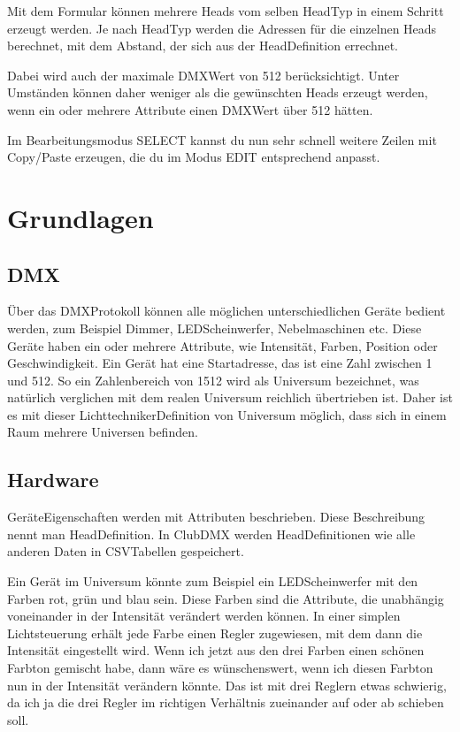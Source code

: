 \documentclass[letterpaper,10pt,ngerman]{sphinxmanual}
\begin{document}
Mit dem Formular können mehrere Heads vom selben Head\sphinxhyphen{}Typ in einem Schritt
erzeugt werden. Je nach Head\sphinxhyphen{}Typ werden die Adressen für die einzelnen Heads
berechnet, mit dem Abstand, der sich aus der Head\sphinxhyphen{}Definition errechnet.

Dabei wird auch der maximale DMX\sphinxhyphen{}Wert von 512 berücksichtigt.
Unter Umständen können daher weniger als die gewünschten Heads erzeugt werden,
wenn ein oder mehrere Attribute einen DMX\sphinxhyphen{}Wert über 512 hätten.

Im Bearbeitungsmodus SELECT kannst du nun sehr schnell weitere
Zeilen mit Copy/Paste erzeugen, die du im Modus EDIT entsprechend anpasst.

\noindent{}


\chapter{Grundlagen}
\label{\detokenize{grundlagen:grundlagen}}\label{\detokenize{grundlagen::doc}}

\section{DMX}
\label{\detokenize{grundlagen:dmx}}
Über das DMX\sphinxhyphen{}Protokoll können alle möglichen unterschiedlichen Geräte bedient
werden, zum Beispiel Dimmer, LED\sphinxhyphen{}Scheinwerfer, Nebelmaschinen etc. Diese Geräte
haben ein oder mehrere Attribute, wie Intensität, Farben,
Position oder Geschwindigkeit.
Ein Gerät hat eine Startadresse, das ist eine Zahl zwischen 1 und 512.
So ein Zahlenbereich von 1\sphinxhyphen{}512 wird als Universum bezeichnet, was natürlich
verglichen mit dem realen Universum reichlich übertrieben ist.
Daher ist es mit dieser Lichttechniker\sphinxhyphen{}Definition von Universum möglich,
dass sich in einem Raum mehrere Universen befinden.


\section{Hardware}
\label{\detokenize{grundlagen:hardware}}
Geräte\sphinxhyphen{}Eigenschaften werden mit Attributen beschrieben.
Diese Beschreibung nennt man Head\sphinxhyphen{}Definition.
In ClubDMX werden Head\sphinxhyphen{}Definitionen wie alle anderen Daten in CSV\sphinxhyphen{}Tabellen
gespeichert.

Ein Gerät im Universum könnte zum Beispiel ein LED\sphinxhyphen{}Scheinwerfer mit den
Farben rot, grün und blau sein. Diese Farben sind die Attribute, die unabhängig
voneinander in der Intensität verändert werden können.
In einer simplen Lichtsteuerung erhält jede Farbe einen Regler zugewiesen,
mit dem dann die Intensität eingestellt wird.
Wenn ich jetzt aus den drei Farben einen schönen Farbton gemischt habe,
dann wäre es wünschenswert, wenn ich diesen Farbton nun in der Intensität
verändern könnte. Das ist mit drei Reglern etwas schwierig, da ich ja
die drei Regler im richtigen Verhältnis zueinander auf oder ab schieben soll.
\end{document}
